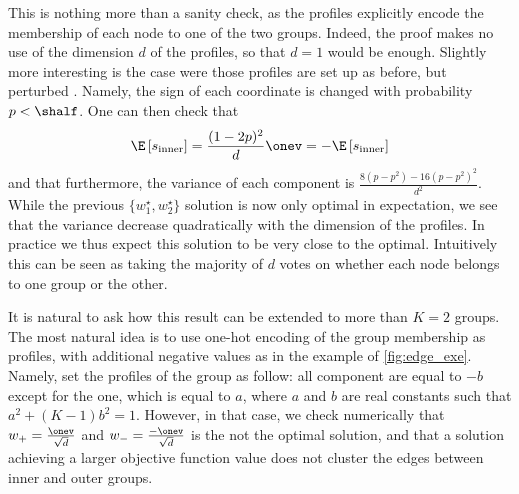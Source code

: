 This is nothing more than a sanity check, as the profiles explicitly encode the membership of each
node to one of the two groups. Indeed, the proof makes no use of the dimension $d$ of the profiles,
so that $d=1$ would be enough. Slightly more interesting is the case were those profiles are set up
as before, but perturbed \uar{}. Namely, the sign of each coordinate is changed with probability $p
< \shalf$. One can then check that
\begin{equation*}
  \E \left[ s_{\mathrm{inner}} \right] = \frac{(1-2p)^2}{d} \onev =
  -\E \left[ s_{\mathrm{inner}} \right] 
\end{equation*}
and that furthermore, the variance of each component is $\frac{8(p-p^2) - 16(p-p^2)^2}{d^2}$. While
the previous $\{w_1^\star, w_2^\star\}$ solution is now only optimal in expectation, we see that the
variance decrease quadratically with the dimension of the profiles. In practice we thus expect this
solution to be very close to the optimal. Intuitively this can be seen as taking the majority of $d$
votes on whether each node belongs to one group or the other.

\begin{aside}
  It is natural to ask how this result can be extended to more than $K=2$ groups. The most natural
  idea is to use one-hot encoding of the group membership as profiles, with additional negative
  values as in the example of \autoref{fig:edge_exe}. Namely, set the profiles of the \ith{} group
  as follow: all component are equal to $-b$ except for the \ith{} one, which is equal to $a$, where
  $a$ and $b$ are real constants such that $a^2 + (K-1)b^2=1$. However, in that case, we check
  numerically that $w_+ = \frac{\onev}{\sqrt{d}}$ and $w_- = \frac{-\onev}{\sqrt{d}}$ is the not the
  optimal solution, and that a solution achieving a larger objective function value does not cluster
  the edges between inner and outer groups.
\end{aside}
